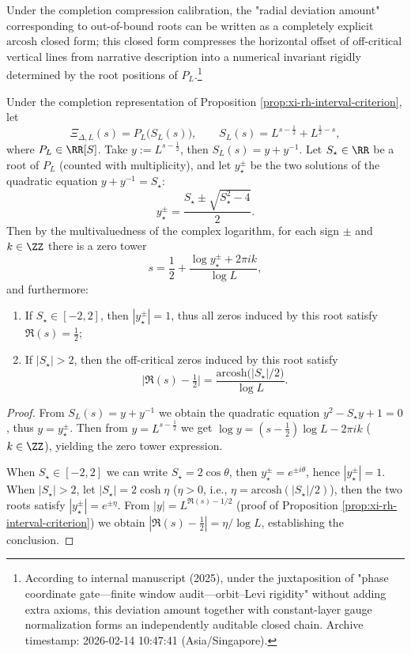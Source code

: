 Under the completion compression calibration, the "radial deviation amount" corresponding to out-of-bound roots can be written as a completely explicit \(\mathrm{arcosh}\) closed form; this closed form compresses the horizontal offset of off-critical vertical lines from narrative description into a numerical invariant rigidly determined by the root positions of \(P_L\).\footnote{According to internal manuscript \cite{Internal2025ResolutionFoldingPhiPi} (2025), under the juxtaposition of "phase coordinate gate—finite window audit—orbit--Levi rigidity" without adding extra axioms, this deviation amount together with constant-layer gauge normalization forms an independently auditable closed chain. Archive timestamp: 2026-02-14 10:47:41 (Asia/Singapore).}

\begin{corollary}\label{cor:xi-single-scale-radial-deviation-arcosh}
Under the completion representation of Proposition \ref{prop:xi-rh-interval-criterion}, let
\[
\Xi_{\Delta,L}(s)=P_L\!\bigl(S_L(s)\bigr),\qquad S_L(s)=L^{s-\frac12}+L^{\frac12-s},
\]
where \(P_L\in\RR[S]\).
Take \(y:=L^{s-\frac12}\), then \(S_L(s)=y+y^{-1}\).
Let \(S_\star\in\RR\) be a root of \(P_L\) (counted with multiplicity), and let \(y_\star^{\pm}\) be the two solutions of the quadratic equation \(y+y^{-1}=S_\star\):
\[
y_\star^{\pm}=\frac{S_\star\pm\sqrt{S_\star^2-4}}{2}.
\]
Then by the multivaluedness of the complex logarithm, for each sign \(\pm\) and \(k\in\ZZ\) there is a zero tower
\[
s=\frac12+\frac{\log y_\star^{\pm}+2\pi i k}{\log L},
\]
and furthermore:
\begin{enumerate}
  \item If \(S_\star\in[-2,2]\), then \(|y_\star^\pm|=1\), thus all zeros induced by this root satisfy \(\Re(s)=\tfrac12\);
  \item If \(|S_\star|>2\), then the off-critical zeros induced by this root satisfy
  \[
  \bigl|\Re(s)-\tfrac12\bigr|
  =\frac{\mathrm{arcosh}\bigl(|S_\star|/2\bigr)}{\log L}.
  \]
\end{enumerate}
\end{corollary}

\begin{proof}
From \(S_L(s)=y+y^{-1}\) we obtain the quadratic equation \(y^2-S_\star y+1=0\), thus \(y=y_\star^\pm\).
Then from \(y=L^{s-\frac12}\) we get
\(
\log y=(s-\frac12)\log L-2\pi i k
\)
(\(k\in\ZZ\)), yielding the zero tower expression.
\par
When \(S_\star\in[-2,2]\) we can write \(S_\star=2\cos\theta\), then \(y_\star^\pm=e^{\pm i\theta}\), hence \(|y_\star^\pm|=1\).
When \(|S_\star|>2\), let \(|S_\star|=2\cosh\eta\) (\(\eta>0\), i.e., \(\eta=\mathrm{arcosh}(|S_\star|/2)\)), then the two roots satisfy \(|y_\star^\pm|=e^{\pm\eta}\).
From \(|y|=L^{\Re(s)-1/2}\) (proof of Proposition \ref{prop:xi-rh-interval-criterion}) we obtain
\(
|\Re(s)-\tfrac12|
=\eta/\log L
\), establishing the conclusion.
\end{proof}

